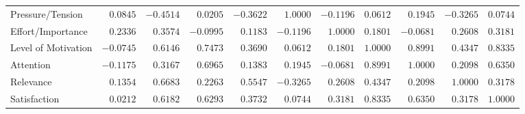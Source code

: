 \documentclass[6pt,a4paper]{article}
\begin{document}
\begin{landscape}
{\begin{longtable}{lrrrrrrrrrr}
Pressure/Tension&$ 0.0845$&$-0.4514$&$ 0.0205$&$-0.3622$&$ 1.0000$&$-0.1196$&$ 0.0612$&$ 0.1945$&$-0.3265$&$0.0744$\tabularnewline
Effort/Importance&$ 0.2336$&$ 0.3574$&$-0.0995$&$ 0.1183$&$-0.1196$&$ 1.0000$&$ 0.1801$&$-0.0681$&$ 0.2608$&$0.3181$\tabularnewline
Level of Motivation&$-0.0745$&$ 0.6146$&$ 0.7473$&$ 0.3690$&$ 0.0612$&$ 0.1801$&$ 1.0000$&$ 0.8991$&$ 0.4347$&$0.8335$\tabularnewline
Attention&$-0.1175$&$ 0.3167$&$ 0.6965$&$ 0.1383$&$ 0.1945$&$-0.0681$&$ 0.8991$&$ 1.0000$&$ 0.2098$&$0.6350$\tabularnewline
Relevance&$ 0.1354$&$ 0.6683$&$ 0.2263$&$ 0.5547$&$-0.3265$&$ 0.2608$&$ 0.4347$&$ 0.2098$&$ 1.0000$&$0.3178$\tabularnewline
Satisfaction&$ 0.0212$&$ 0.6182$&$ 0.6293$&$ 0.3732$&$ 0.0744$&$ 0.3181$&$ 0.8335$&$ 0.6350$&$ 0.3178$&$1.0000$\tabularnewline
\hline
\end{longtable}}


\end{landscape}
\end{document}
